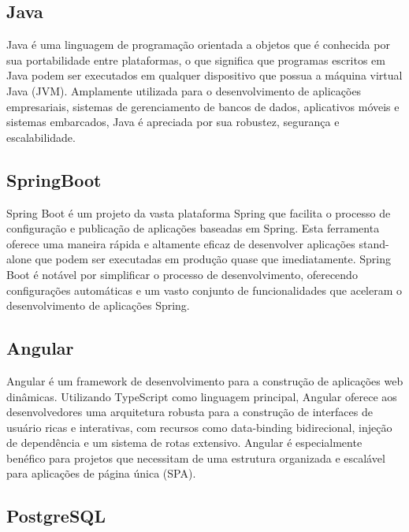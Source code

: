 \subsection{Java}

 Java é uma linguagem de programação orientada a objetos que é conhecida por sua portabilidade entre plataformas, o que significa que programas escritos em Java podem ser executados em qualquer dispositivo que possua a máquina virtual Java (JVM). Amplamente utilizada para o desenvolvimento de aplicações empresariais, sistemas de gerenciamento de bancos de dados, aplicativos móveis e sistemas embarcados, Java é apreciada por sua robustez, segurança e escalabilidade.

\subsection{SpringBoot}

Spring Boot é um projeto da vasta plataforma Spring que facilita o processo de configuração e publicação de aplicações baseadas em Spring. Esta ferramenta oferece uma maneira rápida e altamente eficaz de desenvolver aplicações stand-alone que podem ser executadas em produção quase que imediatamente. Spring Boot é notável por simplificar o processo de desenvolvimento, oferecendo configurações automáticas e um vasto conjunto de funcionalidades que aceleram o desenvolvimento de aplicações Spring.

\subsection{Angular}

Angular é um framework de desenvolvimento para a construção de aplicações web dinâmicas. Utilizando TypeScript como linguagem principal, Angular oferece aos desenvolvedores uma arquitetura robusta para a construção de interfaces de usuário ricas e interativas, com recursos como data-binding bidirecional, injeção de dependência e um sistema de rotas extensivo. Angular é especialmente benéfico para projetos que necessitam de uma estrutura organizada e escalável para aplicações de página única (SPA).

\subsection{PostgreSQL}

